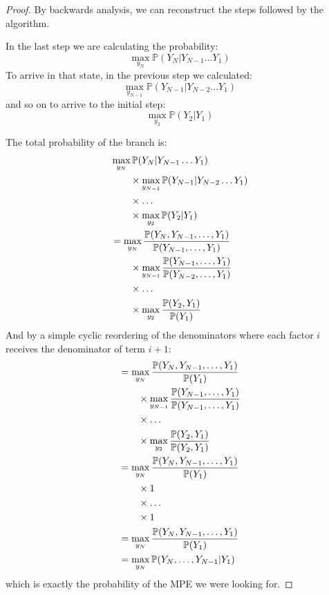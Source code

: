 \documentclass{article}
\begin{document}
\begin{proof}
	By backwards analysis, we can reconstruct the steps followed by the algorithm.

In the last step we are calculating the probability:
\begin{equation}
	\max_{y_N} \mathbb{P}(Y_N | Y_{N-1} \ldots Y_1)
\end{equation}
To arrive in that state, in the previous step we calculated:
\begin{equation}
	\max_{y_{N-1}} \mathbb{P}(Y_{N-1} | Y_{N-2} \ldots Y_1)
\end{equation}
and so on to arrive to the initial step:
\begin{equation}
	\max_{y_2} \mathbb{P}(Y_2 | Y_1)
\end{equation}

The total probability of the branch is:
\begin{equation}
	\begin{split}
	\MoveEqLeft
	\max_{y_N} \mathbb{P}(Y_N | Y_{N-1} \ldots Y_1) \\
	&\times \max_{y_{N-1}} \mathbb{P}(Y_{N-1} | Y_{N-2} \ldots Y_1) \\
	& \times \ldots \\
	& \times \max_{y_2} \mathbb{P}(Y_2 | Y_1) \\
	\MoveEqLeft
	= \max_{y_N} \frac{\mathbb{P}(Y_N, Y_{N-1}, \ldots, Y_1)}{\mathbb{P}(Y_{N-1}, \ldots, Y_1)} \\
	& \times \max_{y_{N-1}} \frac{\mathbb{P}(Y_{N-1}, \ldots, Y_1)}{\mathbb{P}(Y_{N-2}, \ldots, Y_1)} \\
	& \times \ldots \\
	& \times \max_{y_2} \frac{\mathbb{P}(Y_{2}, Y_1)}{\mathbb{P}(Y_1)} \\
\end{split}
\end{equation}
And by a simple cyclic reordering of the denominators where each factor $i$ receives the denominator of term $i+1$:
\begin{equation}
	\begin{split}
	\MoveEqLeft
	= \max_{y_N} \frac{\mathbb{P}(Y_N, Y_{N-1}, \ldots, Y_1)}{\mathbb{P}(Y_1)} \\
	& \times \max_{y_{N-1}} \frac{\mathbb{P}(Y_{N-1}, \ldots, Y_1)}{\mathbb{P}(Y_{N-1}, \ldots, Y_1)} \\
	& \times \ldots \\
	& \times  \max_{y_2} \frac{\mathbb{P}(Y_{2}, Y_1)}{\mathbb{P}(Y_2, Y_1)} \\
	\MoveEqLeft
	= \max_{y_N} \frac{\mathbb{P}(Y_N, Y_{N-1}, \ldots, Y_1)}{\mathbb{P}(Y_1)} \\
	& \times 1 \\
	& \times \ldots \\
	& \times 1 \\
	\MoveEqLeft
	= \max_{y_N}  \frac{\mathbb{P}(Y_N, Y_{N-1}, \ldots, Y_1)}{\mathbb{P}(Y_1)} \\
	\MoveEqLeft
	= \max_{y_N}  \mathbb{P}(Y_N, \ldots,Y_{N-1} | Y_1) \\
\end{split}
\end{equation}
which is exactly the probability of the MPE we were looking for.

\end{proof}
\end{document}
